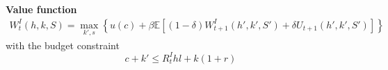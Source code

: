 \textbf{Value function}
\begin{align*}
	W^I_t(h,k,S) =  \max_{k',s} \left\{ u(c) + \beta\mathbb{E}\left[ (1 - \delta) W^I_{t+1}(h',k',S')
	+ \delta  U_{t+1}(h',k',S')  \right] \right\}
\end{align*}
with the budget constraint \[   c + k' \leq R^I_t h l + k(1 +r) \]




%
%


